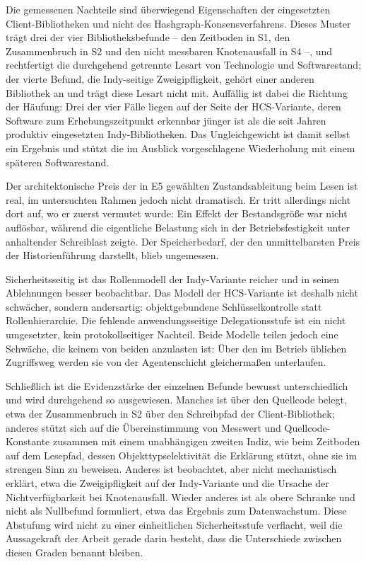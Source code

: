 Die gemessenen Nachteile sind überwiegend Eigenschaften der eingesetzten Client-Bibliotheken und nicht des Hashgraph-Konsensverfahrens. Dieses Muster trägt drei der vier Bibliotheksbefunde -- den Zeitboden in S1, den Zusammenbruch in S2 und den nicht messbaren Knotenausfall in S4 --, und rechtfertigt die durchgehend getrennte Lesart von Technologie und Softwarestand; der vierte Befund, die Indy-seitige Zweigipfligkeit, gehört einer anderen Bibliothek an und trägt diese Lesart nicht mit. Auffällig ist dabei die Richtung der Häufung: Drei der vier Fälle liegen auf der Seite der HCS-Variante, deren Software zum Erhebungszeitpunkt erkennbar jünger ist als die seit Jahren produktiv eingesetzten Indy-Bibliotheken. Das Ungleichgewicht ist damit selbst ein Ergebnis und stützt die im Ausblick vorgeschlagene Wiederholung mit einem späteren Softwarestand.

Der architektonische Preis der in E5 gewählten Zustandsableitung beim Lesen ist real, im untersuchten Rahmen jedoch nicht dramatisch. Er tritt allerdings nicht dort auf, wo er zuerst vermutet wurde: Ein Effekt der Bestandsgröße war nicht auflösbar, während die eigentliche Belastung sich in der Betriebsfestigkeit unter anhaltender Schreiblast zeigte. Der Speicherbedarf, der den unmittelbarsten Preis der Historienführung darstellt, blieb ungemessen.

Sicherheitsseitig ist das Rollenmodell der Indy-Variante reicher und in seinen Ablehnungen besser beobachtbar. Das Modell der HCS-Variante ist deshalb nicht schwächer, sondern andersartig: objektgebundene Schlüsselkontrolle statt Rollenhierarchie. Die fehlende anwendungsseitige Delegationsstufe ist ein nicht umgesetzter, kein protokollseitiger Nachteil. Beide Modelle teilen jedoch eine Schwäche, die keinem von beiden anzulasten ist: Über den im Betrieb üblichen Zugriffsweg werden sie von der Agentenschicht gleichermaßen unterlaufen.

Schließlich ist die Evidenzstärke der einzelnen Befunde bewusst unterschiedlich und wird durchgehend so ausgewiesen. Manches ist über den Quellcode belegt, etwa der Zusammenbruch in S2 über den Schreibpfad der Client-Bibliothek; anderes stützt sich auf die Übereinstimmung von Messwert und Quellcode-Konstante zusammen mit einem unabhängigen zweiten Indiz, wie beim Zeitboden auf dem Lesepfad, dessen Objekttypselektivität die Erklärung stützt, ohne sie im strengen Sinn zu beweisen. Anderes ist beobachtet, aber nicht mechanistisch erklärt, etwa die Zweigipfligkeit auf der Indy-Variante und die Ursache der Nichtverfügbarkeit bei Knotenausfall. Wieder anderes ist als obere Schranke und nicht als Nullbefund formuliert, etwa das Ergebnis zum Datenwachstum. Diese Abstufung wird nicht zu einer einheitlichen Sicherheitsstufe verflacht, weil die Aussagekraft der Arbeit gerade darin besteht, dass die Unterschiede zwischen diesen Graden benannt bleiben.

